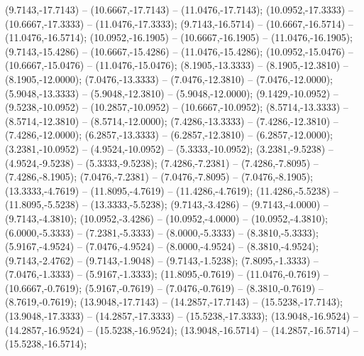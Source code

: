    (9.7143,-17.7143) -- (10.6667,-17.7143) -- (11.0476,-17.7143);
   (10.0952,-17.3333) -- (10.6667,-17.3333) -- (11.0476,-17.3333);
   (9.7143,-16.5714) -- (10.6667,-16.5714) -- (11.0476,-16.5714);
   (10.0952,-16.1905) -- (10.6667,-16.1905) -- (11.0476,-16.1905);
   (9.7143,-15.4286) -- (10.6667,-15.4286) -- (11.0476,-15.4286);
   (10.0952,-15.0476) -- (10.6667,-15.0476) -- (11.0476,-15.0476);
   (8.1905,-13.3333) -- (8.1905,-12.3810) -- (8.1905,-12.0000);
   (7.0476,-13.3333) -- (7.0476,-12.3810) -- (7.0476,-12.0000);
   (5.9048,-13.3333) -- (5.9048,-12.3810) -- (5.9048,-12.0000);
   (9.1429,-10.0952) -- (9.5238,-10.0952) -- (10.2857,-10.0952) -- (10.6667,-10.0952);
   (8.5714,-13.3333) -- (8.5714,-12.3810) -- (8.5714,-12.0000);
   (7.4286,-13.3333) -- (7.4286,-12.3810) -- (7.4286,-12.0000);
   (6.2857,-13.3333) -- (6.2857,-12.3810) -- (6.2857,-12.0000);
   (3.2381,-10.0952) -- (4.9524,-10.0952) -- (5.3333,-10.0952);
   (3.2381,-9.5238) -- (4.9524,-9.5238) -- (5.3333,-9.5238);
   (7.4286,-7.2381) -- (7.4286,-7.8095) -- (7.4286,-8.1905);
   (7.0476,-7.2381) -- (7.0476,-7.8095) -- (7.0476,-8.1905);
   (13.3333,-4.7619) -- (11.8095,-4.7619) -- (11.4286,-4.7619);
   (11.4286,-5.5238) -- (11.8095,-5.5238) -- (13.3333,-5.5238);
   (9.7143,-3.4286) -- (9.7143,-4.0000) -- (9.7143,-4.3810);
   (10.0952,-3.4286) -- (10.0952,-4.0000) -- (10.0952,-4.3810);
   (6.0000,-5.3333) -- (7.2381,-5.3333) -- (8.0000,-5.3333) -- (8.3810,-5.3333);
   (5.9167,-4.9524) -- (7.0476,-4.9524) -- (8.0000,-4.9524) -- (8.3810,-4.9524);
   (9.7143,-2.4762) -- (9.7143,-1.9048) -- (9.7143,-1.5238);
   (7.8095,-1.3333) -- (7.0476,-1.3333) -- (5.9167,-1.3333);
   (11.8095,-0.7619) -- (11.0476,-0.7619) -- (10.6667,-0.7619);
   (5.9167,-0.7619) -- (7.0476,-0.7619) -- (8.3810,-0.7619) -- (8.7619,-0.7619);
   (13.9048,-17.7143) -- (14.2857,-17.7143) -- (15.5238,-17.7143);
   (13.9048,-17.3333) -- (14.2857,-17.3333) -- (15.5238,-17.3333);
   (13.9048,-16.9524) -- (14.2857,-16.9524) -- (15.5238,-16.9524);
   (13.9048,-16.5714) -- (14.2857,-16.5714) -- (15.5238,-16.5714);
